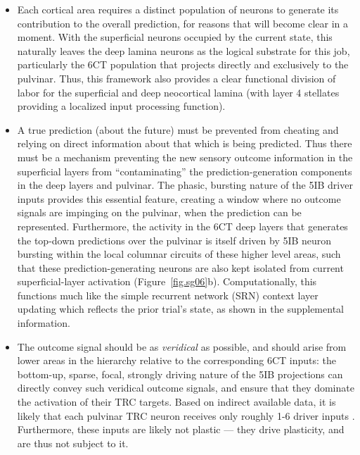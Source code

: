 \documentclass[11pt,twoside]{article}
\newif\myifpdf
\begin{document}
\begin{itemize}
	\item Each cortical area requires a distinct population of neurons to generate its contribution to the overall prediction, for reasons that will become clear in a moment. With the superficial neurons occupied by the current state, this naturally leaves the deep lamina neurons as the logical substrate for this job, particularly the 6CT population that projects directly and exclusively to the pulvinar.  Thus, this framework also provides a clear functional division of labor for the superficial and deep neocortical lamina (with layer 4 stellates providing a localized input processing function).
	
	\item A true prediction (about the future) must be prevented from cheating and relying on direct information about that which is being predicted.  Thus there must be a mechanism preventing the new sensory outcome information in the superficial layers from ``contaminating'' the prediction-generation components in the deep layers and pulvinar.  The phasic, bursting nature of the 5IB driver inputs provides this essential feature, creating a window where no outcome signals are impinging on the pulvinar, when the prediction can be represented.  Furthermore, the activity in the 6CT deep layers that generates the top-down predictions over the pulvinar is itself driven by 5IB neuron bursting within the local columnar circuits of these higher level areas, such that these prediction-generating neurons are also kept isolated from current superficial-layer activation  (Figure~\ref{fig.sg06}b).  Computationally, this functions much like the simple recurrent network (SRN) context layer updating \citep{Elman90,Jordan89} which reflects the prior trial's state, as shown in the supplemental information.

	\item The outcome signal should be as \emph{veridical} as possible, and should arise from lower areas in the hierarchy relative to the corresponding 6CT inputs: the bottom-up, sparse, focal, strongly driving nature of the 5IB projections can directly convey such veridical outcome signals, and ensure that they dominate the activation of their TRC targets.  
	Based on indirect available data, it is likely that each pulvinar TRC neuron receives only roughly 1-6 driver inputs \cite{ShermanGuillery06,ShermanGuillery11}.  Furthermore, these inputs are likely not plastic \citep{UsreySherman18} --- they drive plasticity, and are thus not subject to it. 


\end{itemize}
\end{document}
